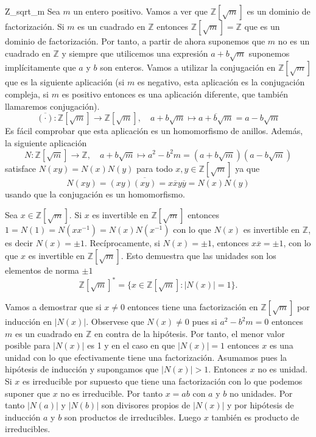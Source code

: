 \begin{example}{}{Z_sqrt_m}
Sea \(m\) un entero positivo. Vamos a ver que \(\mathbb{Z}[\sqrt{m}]\) es un dominio de factorización. Si \(m\) es un cuadrado en \(\mathbb{Z}\) entonces \(\mathbb{Z}[\sqrt{m}] = \mathbb{Z}\) que es un dominio de factorización. Por tanto, a partir de ahora suponemos que \(m\) no es un cuadrado en \(\mathbb{Z}\) y siempre que utilicemos una expresión \(a + b\sqrt{m}\) suponemos implícitamente que \(a\) y \(b\) son enteros. Vamos a utilizar la conjugación en \(\mathbb{Z}[\sqrt{m}]\) que es la siguiente aplicación (si \(m\) es negativo, esta aplicación es la conjugación compleja, si \(m\) es positivo entonces es una aplicación diferente, que también llamaremos conjugación).
\[
\overline{(\cdot)}: \mathbb{Z}[\sqrt{m}] \to \mathbb{Z}[\sqrt{m}], \quad a + b\sqrt{m} \mapsto \overline{a + b\sqrt{m}} = a - b\sqrt{m}
\]
Es fácil comprobar que esta aplicación es un homomorfismo de anillos.  Además, la siguiente aplicación
\[
N: \mathbb{Z}[\sqrt{m}] \to \mathbb{Z}, \quad a + b\sqrt{m} \mapsto a^2 - b^2 m = (a + b\sqrt{m})(a - b\sqrt{m})
\]
satisface \(N(xy) = N(x)N(y)\) para todo \(x, y \in \mathbb{Z}[\sqrt{m}]\) ya que 
\[
N(xy) = (xy)\overline{(xy)} = x \overline{x} y \overline{y} = N(x)N(y)
\]
usando que la conjugación es un homomorfismo.

Sea \(x \in \mathbb{Z}[\sqrt{m}]\). Si \(x\) es invertible en \(\mathbb{Z}[\sqrt{m}]\) entonces \(1 = N(1) = N(xx^{-1}) = N(x)N(x^{-1})\) con lo que \(N(x)\) es invertible en \(\mathbb{Z}\), es decir \(N(x) = \pm 1\). Recíprocamente, si \(N(x) = \pm 1\), entonces \(x\overline{x} = \pm 1\), con lo que \(x\) es invertible en \(\mathbb{Z}[\sqrt{m}]\). Esto demuestra que las unidades son los elementos de norma $\pm 1$
\[
\mathbb{Z}[\sqrt{m}]^* = \{x \in \mathbb{Z}[\sqrt{m}] : |N(x)| = 1\}.
\]

Vamos a demostrar que si \(x \neq 0\) entonces tiene una factorización en \(\mathbb{Z}[\sqrt{m}]\) por inducción en \(|N(x)|\). Observese que \(N(x) \neq 0\) pues si \(a^2 - b^2 m = 0\) entonces \(m\) es un cuadrado en \(\mathbb{Z}\) en contra de la hipótesis. Por tanto, el menor valor posible para \(|N(x)|\) es 1 y en el caso en que \(|N(x)| = 1\) entonces \(x\) es una unidad con lo que efectivamente tiene una factorización. Asumamos pues la hipótesis de inducción y supongamos que \(|N(x)| > 1\). Entonces \(x\) no es unidad. Si \(x\) es irreducible por supuesto que tiene una factorización con lo que podemos suponer que \(x\) no es irreducible. Por tanto \(x = ab\) con \(a\) y \(b\) no unidades. Por tanto \(|N(a)|\) y \(|N(b)|\) son divisores propios de \(|N(x)|\) y por hipótesis de inducción \(a\) y \(b\) son productos de irreducibles. Luego \(x\) también es producto de irreducibles.
\end{example}


